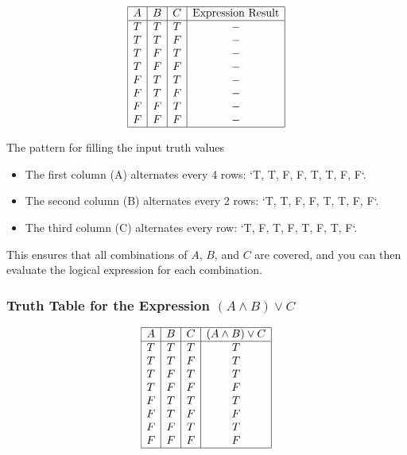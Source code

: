 \[
	\begin{array}{|c|c|c|c|}
		\hline
		A & B & C & \text{Expression Result} \\
		\hline
		T & T & T &       -                  \\
		T & T & F &       -                  \\
		T & F & T &       -                  \\
		T & F & F &       -                  \\
		F & T & T &       -                  \\
		F & T & F &       -                  \\
		F & F & T &       -                  \\
		F & F & F &       -                  \\
		\hline
	\end{array}
\]

The pattern for filling the input truth values

\begin{itemize}

	\item The first column (A) alternates every 4 rows: `T, T, F, F, T, T, F, F`.

	\item The second column (B) alternates every 2 rows: `T, T, F, F, T, T, F, F`.

	\item The third column (C) alternates every row: `T, F, T, F, T, F, T, F`.

\end{itemize}

This ensures that all combinations of \(A\), \(B\), and \(C\) are covered, and you can then evaluate the 
logical expression for each combination.

\subsubsection{Truth Table for the Expression \texorpdfstring{\( (A \land B) \lor C \)}{}}

\[
	\begin{array}{|c|c|c|c|}
		\hline
		A & B & C & (A \land B) \lor C \\
		\hline
		T & T & T & T                  \\
		T & T & F & T                  \\
		T & F & T & T                  \\
		T & F & F & F                  \\
		F & T & T & T                  \\
		F & T & F & F                  \\
		F & F & T & T                  \\
		F & F & F & F                  \\
		\hline
	\end{array}
\]

